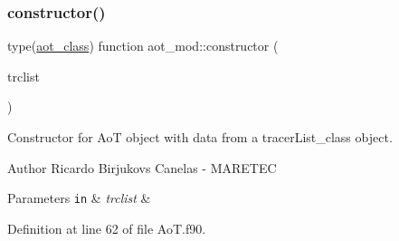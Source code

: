 \subsubsection{\texorpdfstring{constructor()}{constructor()}}
{\footnotesize\ttfamily type(\mbox{\hyperlink{structaot__mod_1_1aot__class}{aot\+\_\+class}}) function aot\+\_\+mod\+::constructor (\begin{DoxyParamCaption}\item[{class(tracerlist\+\_\+class), intent(in)}]{trclist }\end{DoxyParamCaption})\hspace{0.3cm}{\ttfamily [private]}}



Constructor for AoT object with data from a tracer\+List\+\_\+class object. 

\begin{DoxyAuthor}{Author}
Ricardo Birjukovs Canelas -\/ M\+A\+R\+E\+T\+EC 
\end{DoxyAuthor}

\begin{DoxyParams}[1]{Parameters}
\mbox{\tt in}  & {\em trclist} & \\
\hline
\end{DoxyParams}


Definition at line 62 of file Ao\+T.\+f90.


